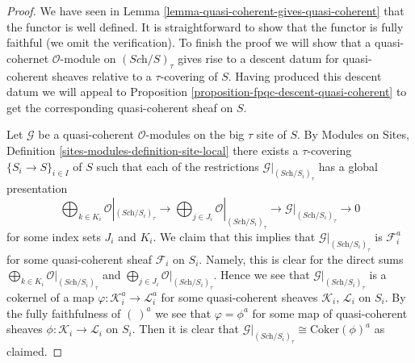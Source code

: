 \begin{proof}
We have seen in Lemma \ref{lemma-quasi-coherent-gives-quasi-coherent}
that the functor is well defined.
It is straightforward to show that the functor is fully faithful (we omit
the verification). To finish the proof we will show that a
quasi-cohernet $\mathcal{O}$-module on $(\textit{Sch}/S)_\tau$ gives
rise to a descent datum for quasi-coherent sheaves relative to a
$\tau$-covering of $S$. Having produced this descent datum we will appeal
to Proposition \ref{proposition-fpqc-descent-quasi-coherent} to get the
corresponding quasi-coherent sheaf on $S$.

\medskip\noindent
Let $\mathcal{G}$ be a quasi-coherent $\mathcal{O}$-modules on
the big $\tau$ site of $S$. By
Modules on Sites, Definition \ref{sites-modules-definition-site-local}
there exists a $\tau$-covering $\{S_i \to S\}_{i \in I}$ of $S$
such that each of the restrictions
$\mathcal{G}|_{(\textit{Sch}/S_i)_\tau}$ has a global presentation
$$
\bigoplus\nolimits_{k \in K_i} \mathcal{O}|_{(\textit{Sch}/S_i)_\tau}
\longrightarrow
\bigoplus\nolimits_{j \in J_i} \mathcal{O}|_{(\textit{Sch}/S_i)_\tau}
\longrightarrow
\mathcal{G}|_{(\textit{Sch}/S_i)_\tau} \longrightarrow 0
$$
for some index sets $J_i$ and $K_i$. We claim that this implies
that $\mathcal{G}|_{(\textit{Sch}/S_i)_\tau}$ is $\mathcal{F}_i^a$
for some quasi-coherent sheaf $\mathcal{F}_i$ on $S_i$. Namely,
this is clear for the direct sums
$\bigoplus\nolimits_{k \in K_i} \mathcal{O}|_{(\textit{Sch}/S_i)_\tau}$
and
$\bigoplus\nolimits_{j \in J_i} \mathcal{O}|_{(\textit{Sch}/S_i)_\tau}$.
Hence we see that $\mathcal{G}|_{(\textit{Sch}/S_i)_\tau}$ is a
cokernel of a map $\varphi : \mathcal{K}_i^a \to \mathcal{L}_i^a$
for some quasi-coherent sheaves $\mathcal{K}_i$, $\mathcal{L}_i$
on $S_i$. By the fully faithfulness of $(\ )^a$ we see that
$\varphi = \phi^a$ for some map of quasi-coherent sheaves
$\phi : \mathcal{K}_i \to \mathcal{L}_i$ on $S_i$. Then it is
clear that
$\mathcal{G}|_{(\textit{Sch}/S_i)_\tau} \cong \text{Coker}(\phi)^a$
as claimed.


\end{proof}
